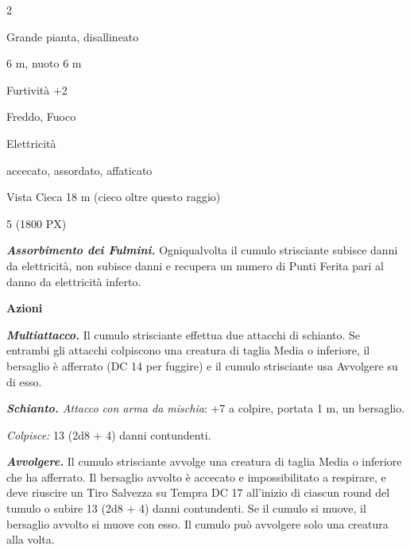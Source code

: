 \begin{multicols}{2}
{
\begin{description}[noitemsep, topsep=0pt, parsep=0pt, partopsep=0pt, itemsep=1pt, leftmargin=2.35cm,  labelwidth=2.2cm, itemindent=0cm, listparindent=0pt] %
\setlength{\baselineskip}{10pt}
\item[\textbf{Taglia/Tipo}] Grande pianta, disallineato
\item[\textbf{Caratt.}] 
\item[\textbf{Punti Ferita}] 
\item[\textbf{Movimento}] 6 m, nuoto 6 m
\item[\textbf{Tiri Salvez.}] 
\item[\textbf{Comp.}] Furtività +2
\item[\textbf{Res. Danni}] Freddo, Fuoco
\item[\textbf{Imm. Danni}] Elettricità
\item[\textbf{Immunità}] accecato, assordato, affaticato
\item[\textbf{Sensi}] Vista Cieca 18 m (cieco oltre questo raggio)
\item[\textbf{Sfida}] 5 (1800 PX)
\end{description}
\smallskip

\emph{\textbf{Assorbimento dei Fulmini.}} Ogniqualvolta il cumulo strisciante subisce danni da elettricità, non subisce danni e recupera un numero di Punti Ferita pari al danno da elettricità inferto.

\textbf{Azioni}

\emph{\textbf{Multiattacco.}} Il cumulo strisciante effettua due attacchi di schianto. Se entrambi gli attacchi colpiscono una creatura di taglia Media o inferiore, il bersaglio è afferrato (DC 14 per fuggire) e il cumulo strisciante usa Avvolgere su di esso.

\emph{\textbf{Schianto.} Attacco con arma da mischia}: +7 a colpire, portata 1 m, un bersaglio.

\emph{Colpisce:} 13 (2d8 + 4) danni contundenti.

\emph{\textbf{Avvolgere.}} Il cumulo strisciante avvolge una creatura di taglia Media o inferiore che ha afferrato. Il bersaglio avvolto è accecato e impossibilitato a respirare, e deve riuscire un Tiro Salvezza su Tempra DC 17 all'inizio di ciascun round del tumulo o subire 13 (2d8 + 4) danni contundenti. Se il cumulo si muove, il bersaglio avvolto si muove con esso. Il cumulo può avvolgere solo una creatura alla volta.

}
\end{multicols}
